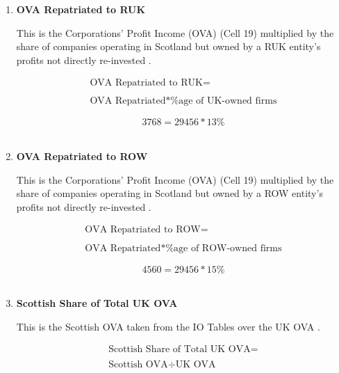 \begin{enumerate}
\item \textbf {OVA Repatriated to RUK}

This is the Corporations' Profit Income (OVA) (Cell 19) multiplied by the share of companies operating in Scotland but owned by a RUK entity's profits not directly re-invested \cite{ONS2011c}.

\begin{equation}
\begin{split}
\text{OVA Repatriated to RUK} =  \\ \\
\text{OVA Repatriated}*\text{\%age of UK-owned firms} 
\end{split} \label{eq:2.5.80}
\end{equation}

\begin{equation} \nonumber
3768 = 29456*13\%
\end{equation}\\


\item \textbf {OVA Repatriated to ROW}

This is the Corporations' Profit Income (OVA) (Cell 19) multiplied by the share of companies operating in Scotland but owned by a ROW entity's profits not directly re-invested \cite{ONS2011c}.

\begin{equation}
\begin{split}
\text{OVA Repatriated to ROW} =  \\ \\
\text{OVA Repatriated}*\text{\%age of ROW-owned firms} 
\end{split} \label{eq:2.5.81}
\end{equation}

\begin{equation} \nonumber
4560 = 29456*15\%
\end{equation}\\


\item \textbf {Scottish Share of Total UK OVA}

This is the Scottish OVA taken from the IO Tables \cite{ScottishGovernment2013a} over the UK OVA \cite{ONS2011c}.

\begin{equation}
\begin{split}
\text{Scottish Share of Total UK OVA} =  \\ \\
\text{Scottish OVA}\div \text{UK OVA} 
\end{split} \label{eq:2.5.82}
\end{equation}


\end{enumerate}
